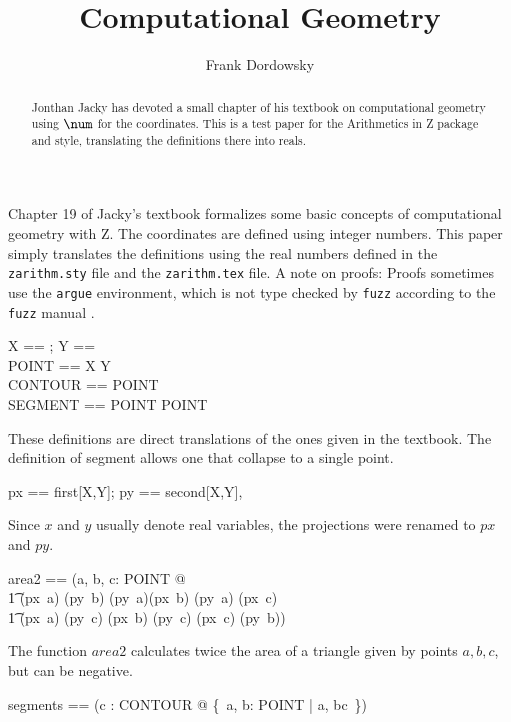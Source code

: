\documentclass[12pt]{scrartcl}
\begin{document}
\title{Computational Geometry}
\author{Frank Dordowsky}

\maketitle

\begin{abstract}
  Jonthan Jacky has devoted a small chapter of his textbook
  \cite{Jacky1997a} on computational geometry using $\num$ for the
  coordinates. This is a test paper for the Arithmetics in Z package
  and style, translating the definitions there into reals.
\end{abstract}


Chapter 19 of Jacky's textbook \cite{Jacky1997a} formalizes some basic
concepts of computational geometry with Z. The  coordinates are
defined using integer numbers. This paper simply translates the
definitions using the real numbers defined in the \texttt{zarithm.sty}
file and the \texttt{zarithm.tex} file.
%
A note on proofs: Proofs sometimes use the \texttt{argue} environment,
which is not type checked by \texttt{fuzz} according to the
\texttt{fuzz} manual \cite{Spivey2000}.
%
\begin{zed}
  X == \real; Y == \real \\
  POINT == X \cross Y \\
  CONTOUR == \seq POINT \\
  SEGMENT == POINT \cross POINT \\
\end{zed}
%
These definitions are direct translations of the ones given in the
textbook. The definition of segment allows one that collapse to a
single point.
%
\begin{zed}
  px == first[X,Y]; py == second[X,Y], 
\end{zed}
%
Since $x$ and $y$ usually denote real variables, the projections were
renamed to $px$ and $py$.
%
\begin{zed}
  area2 == (\lambda a, b, c: POINT @ \\
  \t1 (px~a) \amult (py~b) \aminus (py~a)\amult (px~b) \aplus (py~a)\amult
  (px~c) \\
  \t1 \aminus (px~a) \amult (py~c) \aplus (px~b) \amult (py~c) \aminus
  (px~c) \amult (py~b))
\end{zed}
%
The function $area2$ calculates twice the area of a triangle given by
points $a,b,c$, but can be negative. 
%
\begin{zed}
  segments == (\lambda c : CONTOUR @ \{~a, b: POINT | \langle a,
  b\rangle \inseq c~\})
\end{zed}
\end{document}
